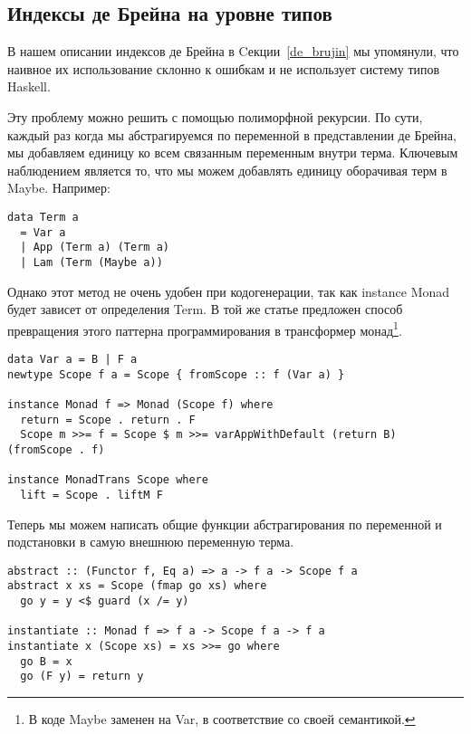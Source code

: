 \pagebreak
\subsection{Индексы де Брейна на уровне типов}\label{de_brujin_impl}
В нашем описании индексов де Брейна в Cекции~\ref{de_brujin} мы упомянули, что наивное их использование склонно к ошибкам и не использует систему типов Haskell.

Эту проблему можно решить с помощью полиморфной рекурсии\cite{Bird:Pat}. По сути, каждый раз когда мы абстрагируемся по переменной в представлении де Брейна, мы добавляем единицу ко всем связанным переменным внутри терма. Ключевым наблюдением является то, что мы можем добавлять единицу оборачивая терм в Maybe. Например:


\begin{lstlisting}[frame=single]
data Term a
  = Var a
  | App (Term a) (Term a)
  | Lam (Term (Maybe a))
\end{lstlisting}


Однако этот метод не очень удобен при кодогенерации, так как instance Monad будет зависет от определения Term. В той же статье предложен способ превращения этого паттерна программирования в трансформер монад\footnote{В коде Maybe заменен на Var, в соответствие со своей семантикой.}.


\begin{lstlisting}[frame=single]
data Var a = B | F a
newtype Scope f a = Scope { fromScope :: f (Var a) }

instance Monad f => Monad (Scope f) where
  return = Scope . return . F
  Scope m >>= f = Scope $ m >>= varAppWithDefault (return B) (fromScope . f)

instance MonadTrans Scope where
  lift = Scope . liftM F

\end{lstlisting}


Теперь мы можем написать общие функции абстрагирования по переменной и подстановки в самую внешнюю переменную терма.


\begin{lstlisting}[frame=single]
abstract :: (Functor f, Eq a) => a -> f a -> Scope f a
abstract x xs = Scope (fmap go xs) where
  go y = y <$ guard (x /= y)

instantiate :: Monad f => f a -> Scope f a -> f a
instantiate x (Scope xs) = xs >>= go where
  go B = x
  go (F y) = return y

\end{lstlisting}


